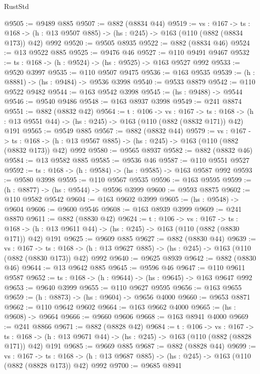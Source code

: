 \begin{lexlean}{RustStd}
\begin{coremodule}
@9505 := @9489 @885
@9507 := @882 (@8834 @44)
@9519 := {vs : @167} ->
  {ts : @168} -> (h : @13 @9507 @885) -> (hs : @245) -> @163 (@110 (@882 (@8834 @173)) @42) @992
@9520 := @9505 @8935
@9522 := @882 (@8834 @46)
@9524 := @13 @9522 @885
@9525 := @9476 @46
@9527 := @110 @9491 @9467
@9532 := {ts : @168} -> (h : @9524) -> (hs : @9525) -> @163 @9527 @992
@9533 := @9520 @3997
@9535 := @110 @9507 @9475
@9536 := @163 @9535
@9539 := (h : @8881) -> (hs : @9484) -> @9536 @3998
@9540 := @9533 @8879
@9542 := @110 @9522 @9482
@9544 := @163 @9542 @3998
@9545 := (hs : @9488) -> @9544
@9546 := @9540 @9486
@9548 := @163 @8937 @3998
@9549 := @241 @8874
@9551 := @882 (@8832 @42)
@9564 := {t : @106} ->
  {vs : @167} ->
  {ts : @168} -> (h : @13 @9551 @44) -> (hs : @245) -> @163 (@110 (@882 (@8832 @171)) @42) @191
@9565 := @9549 @885
@9567 := @882 (@8832 @44)
@9579 := {vs : @167} ->
  {ts : @168} -> (h : @13 @9567 @885) -> (hs : @245) -> @163 (@110 (@882 (@8832 @173)) @42) @992
@9580 := @9565 @8937
@9582 := @882 (@8832 @46)
@9584 := @13 @9582 @885
@9585 := @9536 @46
@9587 := @110 @9551 @9527
@9592 := {ts : @168} -> (h : @9584) -> (hs : @9585) -> @163 @9587 @992
@9593 := @9580 @3998
@9595 := @110 @9567 @9535
@9596 := @163 @9595
@9599 := (h : @8877) -> (hs : @9544) -> @9596 @3999
@9600 := @9593 @8875
@9602 := @110 @9582 @9542
@9604 := @163 @9602 @3999
@9605 := (hs : @9548) -> @9604
@9606 := @9600 @9546
@9608 := @163 @8939 @3999
@9609 := @241 @8870
@9611 := @882 (@8830 @42)
@9624 := {t : @106} ->
  {vs : @167} ->
  {ts : @168} -> (h : @13 @9611 @44) -> (hs : @245) -> @163 (@110 (@882 (@8830 @171)) @42) @191
@9625 := @9609 @885
@9627 := @882 (@8830 @44)
@9639 := {vs : @167} ->
  {ts : @168} -> (h : @13 @9627 @885) -> (hs : @245) -> @163 (@110 (@882 (@8830 @173)) @42) @992
@9640 := @9625 @8939
@9642 := @882 (@8830 @46)
@9644 := @13 @9642 @885
@9645 := @9596 @46
@9647 := @110 @9611 @9587
@9652 := {ts : @168} -> (h : @9644) -> (hs : @9645) -> @163 @9647 @992
@9653 := @9640 @3999
@9655 := @110 @9627 @9595
@9656 := @163 @9655
@9659 := (h : @8873) -> (hs : @9604) -> @9656 @4000
@9660 := @9653 @8871
@9662 := @110 @9642 @9602
@9664 := @163 @9662 @4000
@9665 := (hs : @9608) -> @9664
@9666 := @9660 @9606
@9668 := @163 @8941 @4000
@9669 := @241 @8866
@9671 := @882 (@8828 @42)
@9684 := {t : @106} ->
  {vs : @167} ->
  {ts : @168} -> (h : @13 @9671 @44) -> (hs : @245) -> @163 (@110 (@882 (@8828 @171)) @42) @191
@9685 := @9669 @885
@9687 := @882 (@8828 @44)
@9699 := {vs : @167} ->
  {ts : @168} -> (h : @13 @9687 @885) -> (hs : @245) -> @163 (@110 (@882 (@8828 @173)) @42) @992
@9700 := @9685 @8941

\end{coremodule}
\end{lexlean}
